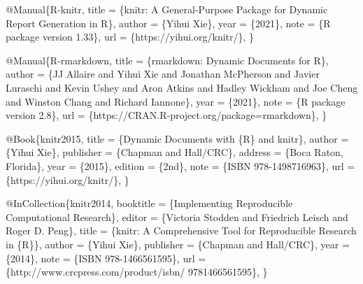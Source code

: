 \documentclass[
  11pt,
  lualatex,
  ja=standard]{bxjsreport}
\newenvironment{Shaded}{\begin{snugshade}}{\end{snugshade}}
\newcommand{\DataTypeTok}[1]{\textcolor[rgb]{0.13,0.29,0.53}{#1}}
\newcommand{\NormalTok}[1]{#1}
\newcommand{\OtherTok}[1]{\textcolor[rgb]{0.56,0.35,0.01}{#1}}
\newcommand{\VariableTok}[1]{\textcolor[rgb]{0.00,0.00,0.00}{#1}}
\begin{document}
\begin{Shaded}
\begin{Highlighting}[]
\VariableTok{@Manual}\NormalTok{\{}\OtherTok{R}\NormalTok{{-}}\OtherTok{knitr}\NormalTok{,}
  \DataTypeTok{title}\NormalTok{ = \{knitr: A General{-}Purpose Package for Dynamic}
\NormalTok{    Report Generation in R\},}
  \DataTypeTok{author}\NormalTok{ = \{Yihui Xie\},}
  \DataTypeTok{year}\NormalTok{ = \{2021\},}
  \DataTypeTok{note}\NormalTok{ = \{R package version 1.33\},}
  \DataTypeTok{url}\NormalTok{ = \{https://yihui.org/knitr/\},}
\NormalTok{\}}

\VariableTok{@Manual}\NormalTok{\{}\OtherTok{R}\NormalTok{{-}}\OtherTok{rmarkdown}\NormalTok{,}
  \DataTypeTok{title}\NormalTok{ = \{rmarkdown: Dynamic Documents for R\},}
  \DataTypeTok{author}\NormalTok{ = \{JJ Allaire and Yihui Xie and Jonathan McPherson}
\NormalTok{    and Javier Luraschi and Kevin Ushey and Aron Atkins}
\NormalTok{    and Hadley Wickham and Joe Cheng and Winston Chang and}
\NormalTok{    Richard Iannone\},}
  \DataTypeTok{year}\NormalTok{ = \{2021\},}
  \DataTypeTok{note}\NormalTok{ = \{R package version 2.8\},}
  \DataTypeTok{url}\NormalTok{ = \{https://CRAN.R{-}project.org/package=rmarkdown\},}
\NormalTok{\}}

\VariableTok{@Book}\NormalTok{\{}\OtherTok{knitr2015}\NormalTok{,}
  \DataTypeTok{title}\NormalTok{ = \{Dynamic Documents with \{R\} and knitr\},}
  \DataTypeTok{author}\NormalTok{ = \{Yihui Xie\},}
  \DataTypeTok{publisher}\NormalTok{ = \{Chapman and Hall/CRC\},}
  \DataTypeTok{address}\NormalTok{ = \{Boca Raton, Florida\},}
  \DataTypeTok{year}\NormalTok{ = \{2015\},}
  \DataTypeTok{edition}\NormalTok{ = \{2nd\},}
  \DataTypeTok{note}\NormalTok{ = \{ISBN 978{-}1498716963\},}
  \DataTypeTok{url}\NormalTok{ = \{https://yihui.org/knitr/\},}
\NormalTok{\}}

\VariableTok{@InCollection}\NormalTok{\{}\OtherTok{knitr2014}\NormalTok{,}
  \DataTypeTok{booktitle}\NormalTok{ = \{Implementing Reproducible Computational}
\NormalTok{    Research\},}
  \DataTypeTok{editor}\NormalTok{ = \{Victoria Stodden and Friedrich Leisch and Roger}
\NormalTok{    D. Peng\},}
  \DataTypeTok{title}\NormalTok{ = \{knitr: A Comprehensive Tool for Reproducible}
\NormalTok{    Research in \{R\}\},}
  \DataTypeTok{author}\NormalTok{ = \{Yihui Xie\},}
  \DataTypeTok{publisher}\NormalTok{ = \{Chapman and Hall/CRC\},}
  \DataTypeTok{year}\NormalTok{ = \{2014\},}
  \DataTypeTok{note}\NormalTok{ = \{ISBN 978{-}1466561595\},}
  \DataTypeTok{url}\NormalTok{ = \{http://www.crcpress.com/product/isbn/}
\NormalTok{    9781466561595\},}
\NormalTok{\}}


\end{Highlighting}
\end{Shaded}
\end{document}
